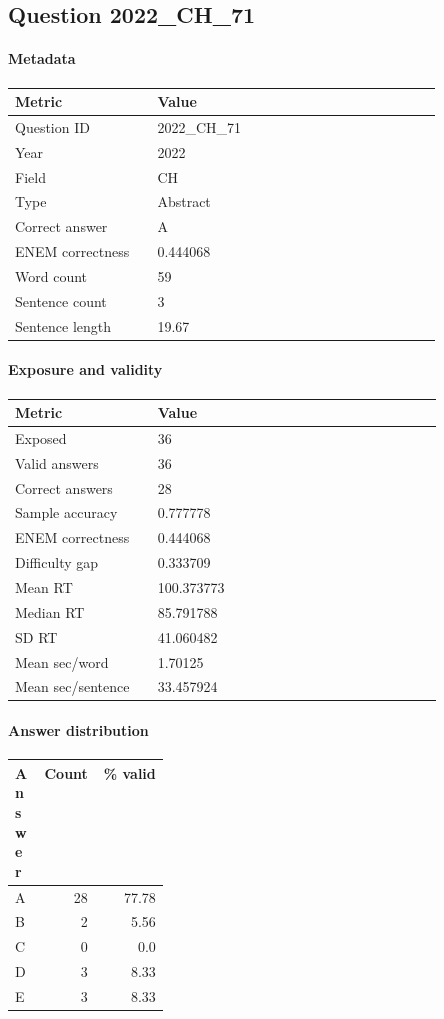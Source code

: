 \subsection*{Question 2022\_CH\_71}
\label{sec:q_2022_CH_71}
\paragraph{Metadata}
\begin{tabular}{p{0.30\linewidth}p{0.60\linewidth}}
\toprule
Metric & Value\\
\midrule
Question ID & 2022\_CH\_71\\
Year & 2022\\
Field & CH\\
Type & Abstract\\
Correct answer & A\\
ENEM correctness & 0.444068\\
Word count & 59\\
Sentence count & 3\\
Sentence length & 19.67\\
\bottomrule
\end{tabular}

\paragraph{Exposure and validity}
\begin{tabular}{p{0.30\linewidth}p{0.60\linewidth}}
\toprule
Metric & Value\\
\midrule
Exposed & 36\\
Valid answers & 36\\
Correct answers & 28\\
Sample accuracy & 0.777778\\
ENEM correctness & 0.444068\\
Difficulty gap & 0.333709\\
Mean RT & 100.373773\\
Median RT & 85.791788\\
SD RT & 41.060482\\
Mean sec/word & 1.70125\\
Mean sec/sentence & 33.457924\\
\bottomrule
\end{tabular}

\paragraph{Answer distribution}
\begin{tabular}{p{0.18\linewidth}rr}
\toprule
Answer & Count & \% valid\\
\midrule
A & 28 & 77.78\\
B & 2 & 5.56\\
C & 0 & 0.0\\
D & 3 & 8.33\\
E & 3 & 8.33\\
\bottomrule
\end{tabular}

